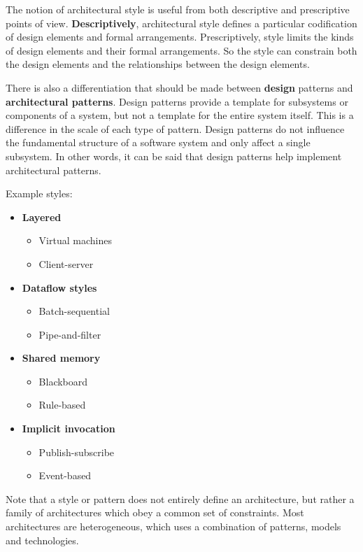 \documentclass{sty/SizheArticle}
\begin{document}
The notion of architectural style is useful from both descriptive and prescriptive
points of view. \textbf{Descriptively}, architectural style defines a
particular codification of design elements and formal arrangements.
Prescriptively, style limits the kinds of design elements and their formal
arrangements. So the style can constrain both the design elements and the
relationships between the design elements.

There is also a differentiation that should be made between \textbf{design}
patterns and \textbf{architectural patterns}. Design patterns provide
a template for subsystems or components of a system, but not a template
for the entire system itself. This is a difference in the scale of each
type of pattern. Design patterns do not influence the fundamental structure
of a software system and only affect a single subsystem. In other words,
it can be said that design patterns help implement architectural patterns.

Example styles:
\begin{itemize}
\item \textbf{Layered}
	\begin{itemize}
	\item Virtual machines
	\item Client-server
	\end{itemize}
\item \textbf{Dataflow styles}
	\begin{itemize}
	\item Batch-sequential
	\item Pipe-and-filter
	\end{itemize}
\item \textbf{Shared memory}
	\begin{itemize}
	\item Blackboard
	\item Rule-based
	\end{itemize}
\item \textbf{Implicit invocation}
	\begin{itemize}
	\item Publish-subscribe
	\item Event-based
	\end{itemize}
\end{itemize}

Note that a style or pattern does not entirely define an architecture, but
rather a family of architectures which obey a common set of constraints.
Most architectures are heterogeneous, which uses a combination of patterns,
models and technologies.
\end{document}
